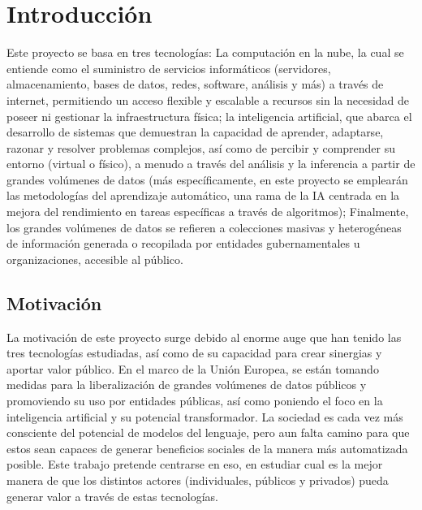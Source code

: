 \chapter{Introducción}
\label{cap:introduccion}


\vspace{1cm}

Este proyecto se basa en tres tecnologías: La computación en la nube, la cual se entiende como el suministro de servicios informáticos (servidores, almacenamiento, bases de datos, redes, software, análisis y más) a través de internet, permitiendo un acceso flexible y escalable a recursos sin la necesidad de poseer ni gestionar la infraestructura física; la inteligencia artificial, que abarca el desarrollo de sistemas que demuestran la capacidad de aprender, adaptarse, razonar y resolver problemas complejos, así como de percibir y comprender su entorno (virtual o físico), a menudo a través del análisis y la inferencia a partir de grandes volúmenes de datos (más específicamente, en este proyecto se emplearán las metodologías del aprendizaje automático, una rama de la IA centrada en la mejora del rendimiento en tareas específicas a través de algoritmos); Finalmente, los grandes volúmenes de datos se refieren a colecciones masivas y heterogéneas de información generada o recopilada por entidades gubernamentales u organizaciones, accesible al público. 

\section{Motivación}

La motivación de este proyecto surge debido al enorme auge que han tenido las tres tecnologías estudiadas, así como de su capacidad para crear sinergias y aportar valor público. En el marco de la Unión Europea, se están tomando medidas para la liberalización de grandes volúmenes de datos públicos y promoviendo su uso por entidades públicas, así como poniendo el foco en la inteligencia artificial y su potencial transformador. La sociedad es cada vez más consciente del potencial de modelos del lenguaje, pero aun falta camino para que estos sean capaces de generar beneficios sociales de la manera más automatizada posible. Este trabajo pretende centrarse en eso, en estudiar cual es la mejor manera de que los distintos actores (individuales, públicos y privados) pueda generar valor a través de estas tecnologías.


